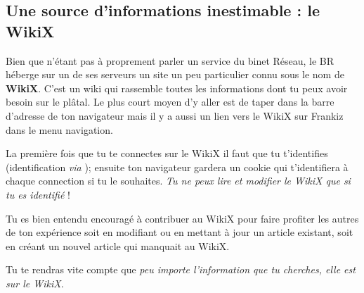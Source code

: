 
\subsection{Une source d'informations inestimable : le WikiX}
\label{WikiX}
Bien que n'\'etant pas \`a proprement parler un service du binet R\'eseau, le BR h\'eberge sur un de ses serveurs un site un peu particulier connu sous le nom de \textbf{WikiX}. C'est un wiki qui rassemble toutes les informations dont tu peux avoir besoin sur le pl\^atal. Le plus court moyen d'y aller est de taper  dans la barre d'adresse de ton navigateur mais il y a aussi un lien vers le WikiX sur Frankiz dans le menu navigation.

La premi\`ere fois que tu te connectes sur le WikiX il faut que tu t'identifies (identification \emph{via} ); ensuite ton navigateur gardera un cookie qui t'identifiera \`a chaque connection si tu le souhaites. \emph{Tu ne peux lire et modifier le WikiX que si tu es identifi\'e} !

Tu es bien entendu encourag\'e \`a contribuer au WikiX pour faire profiter les autres de ton exp\'erience soit en modifiant ou en mettant \`a jour un article existant, soit en cr\'eant un nouvel article qui manquait au WikiX.


Tu te rendras vite compte que \emph{peu importe l'information que tu cherches, elle est sur le WikiX.}
